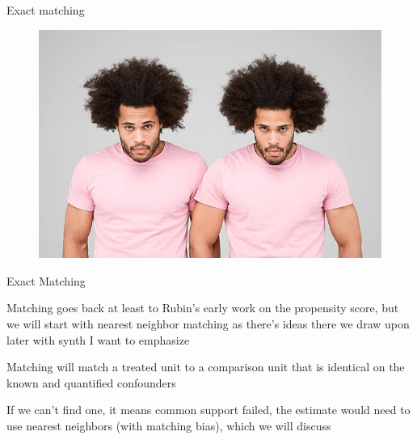 \documentclass{beamer}
\begin{document}
\begin{frame}{Exact matching}

\begin{figure}[!t]\centering
\includegraphics[scale=1.1]{./lecture_includes/identical_twins}
\end{figure}

\end{frame}

\begin{frame}{Exact Matching}


Matching goes back at least to Rubin's early work on the propensity score, but we will start with nearest neighbor matching as there's ideas there we draw upon later with synth I want to emphasize

\bigskip

Matching will match a treated unit to a comparison unit that is identical on the known and quantified confounders

\bigskip

If we can't find one, it means common support failed, the estimate would need to use nearest neighbors (with matching bias), which we will discuss



\end{frame}
\end{document}
